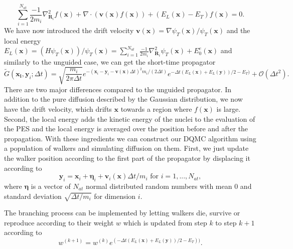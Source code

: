 \documentclass [12pt]{report}
\begin{document}
\begin{equation} \label{eq:2.8}
\sum_{i=1}^{N_{at}} \frac{-1}{2m_i} \nabla^2_{\bm{R}_i} f(\bm{x}) + \nabla \cdot (\bm{v}(\bm{x}) f(\bm{x})) + (E_L(\bm{x}) - E_T)f(\bm{x}) = 0.
\end{equation}
We have now introduced the drift velocity $\bm{v}(\bm{x}) = \nabla \psi_T(\bm{x})/ \psi_T(\bm{x})$ and the local energy $E_L(\bm{x}) = (H\psi_T(\bm{x}))/\psi_T(\bm{x}) = \sum_{i=1}^{N_{at}} \frac{-1}{2m_i} \nabla^2_{\bm{R}_i} \psi_T(\bm{x}) + E_0^e(\bm{x})$ and similarly to the unguided case, we can get the short-time propagator
\begin{equation} \label{eq:2.9}
\tilde{G}(\bm{x_i},\bm{y}_i;\Delta t) = \sqrt{\frac{m_i}{2 \pi \Delta t}} e^{-(\bm{x}_i-\bm{y}_i-\bm{v}(\bm{x})\Delta t)^2 m_i/(2 \Delta t)} e^{-\Delta t (E_L(\bm{x})+E_L(\bm{y}))/2 - E_T)} + \mathcal{O}(\Delta t^2).
\end{equation}
There are two major differences compared to the unguided propagator. In addition to the pure diffusion described by the Gaussian distribution, we now have the drift velocity, which drifts $\bm{x}$ towards a region where $f(\bm{x})$ is large. Second, the local energy adds the kinetic energy of the nuclei to the evaluation of the PES and the local energy is averaged over the position before and after the propagation. 
With these ingredients we can construct our DQMC algorithm using a population of walkers and simulating diffusion on them. First, we just update the walker position according to the first part of the propagator by displacing it according to
\begin{equation}\label{2.10}
\bm{y}_i = \bm{x}_i + \bm{\eta}_i + \bm{v}_i(\bm{x})\Delta t/m_i \text{ for } i=1,...,N_{at},
\end{equation}
where $\bm{\eta}$ is a vector of $N_{at}$ normal distributed random numbers with mean $0$ and standard deviation $\sqrt{\Delta t / m_i}$ for dimension $i$.

The branching process can be implemented by letting walkers die, survive or reproduce according to their weight $w$ which is updated from step $k$ to step $k+1$ according to 
\begin{equation}\label{eq:2.11} 
w^{(k+1)} = w^{(k)} e^{(-\Delta t(E_L(\bm{x}) + E_L(\bm{y}))/2 - E_T))}.
\end{equation}
\end{document}
